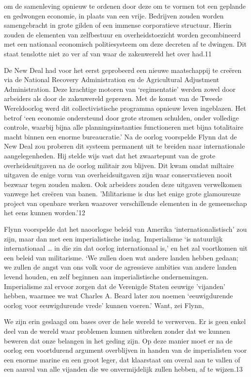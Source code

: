 \documentclass[
  a5paper,
  smalldemyvopaper,10pt,twoside,onecolumn,openright,extrafontsizes,hidelinks]{memoir}
\renewenvironment{quote}%
               {\list{}{\rightmargin=.6cm\leftmargin=.6cm}%
                \itshape \item[]}%
               {\endlist}
\begin{document}
\begin{quote}
om de samenleving opnieuw te ordenen door deze om te vormen tot een
geplande en gedwongen economie, in plaats van een vrije. Bedrijven
zouden worden samengebracht in grote gilden of een immense corporatieve
structuur. Hierin zouden de elementen van zelfbestuur en
overheidstoezicht worden gecombineerd met een nationaal economisch
politiesysteem om deze decreten af te dwingen. Dit staat tenslotte niet
zo ver af van waar de zakenwereld het over had.11
\end{quote}

De New Deal had voor het eerst geprobeerd een nieuwe maatschappij te
creëren via de National Recovery Administration en de Agricultural
Adjustment Administration. Deze krachtige motoren van `regimentatie'
werden zowel door arbeiders als door de zakenwereld geprezen. Met de
komst van de Tweede Wereldoorlog werd dit collectivistische programma
opnieuw leven ingeblazen. Het betrof `een economie ondersteund door
grote stromen schulden, onder volledige controle, waarbij bijna alle
planningsinstanties functioneren met bijna totalitaire macht binnen een
enorme bureaucratie.' Na de oorlog voorspelde Flynn dat de New Deal zou
proberen dit systeem permanent uit te breiden naar internationale
aangelegenheden. Hij stelde wijs vast dat het zwaartepunt van de grote
overheidsuitgaven na de oorlog militair zou blijven. Dit kwam omdat
miltaire uitgaven de enige vorm van overheidsuitgaven zijn waar
conservatieven nooit bezwaar tegen zouden maken. Ook arbeiders zouden
deze uitgaven verwelkomen vanwege het creëren van banen. 'Militarisme is
dus het enige grote glamoureuze project van openbare werken waarover
verschillende elementen in de gemeenschap het eens kunnen worden.'12

Flynn voorspelde dat het naoorlogse beleid van Amerika
`internationalistisch' zou zijn, maar dan met een imperialistische
inslag. Imperialisme `is natuurlijk internationaal \ldots{} in die zin
dat oorlog internationaal is,' en het zal voortkomen uit een beleid van
militarisme. `We zullen doen wat andere landen hebben gedaan; we zullen
de angst van ons volk voor de agressieve ambities van andere landen
levend houden, en zelf beginnen aan imperialistische ondernemingen.
Imperialisme zal ervoor zorgen dat de Verenigde Staten eeuwige
'vijanden' hebben, waarmee we wat Charles A. Beard later zou noemen
`eeuwigdurende oorlog voor eeuwigdurende vrede' kunnen voeren.' Want,
zei Flynn,

\begin{quote}
We zijn erin geslaagd om bases over de hele wereld te verwerven. Er is
geen enkel deel van de wereld waar problemen kunnen uitbreken zonder dat
we kunnen beweren dat onze belangen in het geding zijn. Op deze manier
moet er na de oorlog een voortdurend argument overblijven in handen van
de imperialisten voor een enorme marine en een groot leger, dat
klaarstaat om overal aan te vallen of een aanval van alle vijanden die
we onvermijdelijk zullen hebben, af te wijzen.13
\end{quote}
\end{document}
